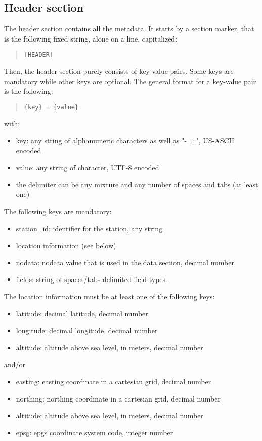 \documentclass[a4paper,10pt]{article}
\begin{document}
\subsection{Header section}
The header section contains all the metadata. It starts by a section marker, that is the following fixed string, alone on a line, capitalized:
\begin{quote} \begin{verbatim}
[HEADER]
\end{verbatim}\end{quote} 
Then, the header section purely consists of key-value pairs. Some keys are mandatory while other keys are optional. The general format for a key-value pair is the following:
\begin{quote} \begin{verbatim}
{key} = {value}
\end{verbatim}\end{quote} 
with:
\begin{itemize}
	\item key: any string of alphanumeric characters as well as "-\_:.", US-ASCII encoded
	\item value: any string of character, UTF-8 encoded
	\item the delimiter can be any mixture and any number of spaces and tabs (at least one)
\end{itemize}
The following keys are mandatory:
\begin{itemize}
	\item station\_id: identifier for the station, any string
	\item location information (see below)
	\item nodata: nodata value that is used in the data section, decimal number
	\item fields: string of spaces/tabs delimited field types.
\end{itemize}
The location information must be at least one of the following keys:
\begin{itemize}
	\item latitude: decimal latitude, decimal number
	\item longitude: decimal longitude, decimal number
	\item altitude: altitude above sea level, in meters, decimal number
\end{itemize}
and/or
\begin{itemize}
	\item easting: easting coordinate in a cartesian grid, decimal number
	\item northing: northing coordinate in a cartesian grid, decimal number
	\item altitude: altitude above sea level, in meters, decimal number
	\item epsg: epgs coordinate system code, integer number
\end{itemize}
\end{document}
